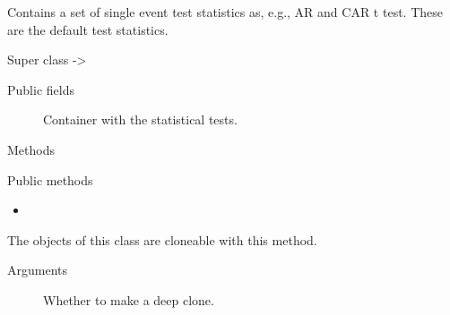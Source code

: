 \documentclass[a4paper]{book}
\begin{document}
%
\begin{Description}
Contains a set of single event test statistics as, e.g., AR and CAR t test.
These are the default test statistics.
\end{Description}
%
\begin{Section}{Super class}
 -> 
\end{Section}
%
\begin{Section}{Public fields}

\begin{description}

\item[] Container with the statistical tests.

\end{description}


\end{Section}
%
\begin{Section}{Methods}
%
\begin{SubSection}{Public methods}
\begin{itemize}

\item{} 

\end{itemize}

\end{SubSection}




\hypertarget{method-SingleEventStatisticsSet-clone}{}
%
\begin{SubSection}{}
The objects of this class are cloneable with this method.
%

%
\begin{SubSubSection}{Arguments}

\begin{description}

\item[] Whether to make a deep clone.

\end{description}



\end{SubSubSection}

\end{SubSection}


\end{Section}
\end{document}
